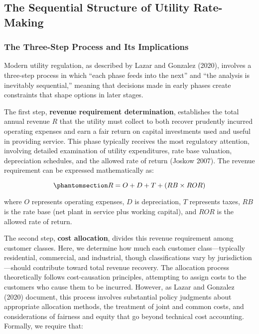 \documentclass[
  11pt,
]{article}
\begin{document}
\subsection{The Sequential Structure of Utility
Rate-Making}\label{the-sequential-structure-of-utility-rate-making}

\subsubsection{The Three-Step Process and Its
Implications}\label{the-three-step-process-and-its-implications}

Modern utility regulation, as described by Lazar and Gonzalez (2020),
involves a three-step process in which ``each phase feeds into the
next'' and ``the analysis is inevitably sequential,'' meaning that
decisions made in early phases create constraints that shape options in
later stages.

The first step, \textbf{revenue requirement determination}, establishes
the total annual revenue \(R\) that the utility must collect to both
recover prudently incurred operating expenses and earn a fair return on
capital investments used and useful in providing service. This phase
typically receives the most regulatory attention, involving detailed
examination of utility expenditures, rate base valuation, depreciation
schedules, and the allowed rate of return (Joskow 2007). The revenue
requirement can be expressed mathematically as:

\begin{equation}\phantomsection\label{eq-revenue}{R = O + D + T + (RB \times ROR)}\end{equation}

where \(O\) represents operating expenses, \(D\) is depreciation, \(T\)
represents taxes, \(RB\) is the rate base (net plant in service plus
working capital), and \(ROR\) is the allowed rate of return.

The second step, \textbf{cost allocation}, divides this revenue
requirement among customer classes. Here, we determine how much each
customer class---typically residential, commercial, and industrial,
though classifications vary by jurisdiction---should contribute toward
total revenue recovery. The allocation process theoretically follows
cost-causation principles, attempting to assign costs to the customers
who cause them to be incurred. However, as Lazar and Gonzalez (2020)
document, this process involves substantial policy judgments about
appropriate allocation methods, the treatment of joint and common costs,
and considerations of fairness and equity that go beyond technical cost
accounting. Formally, we require that:
\end{document}
